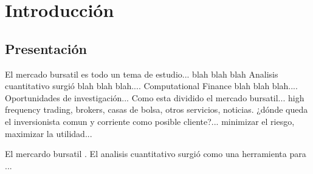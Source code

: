 

\chapter{Introducción}


\section{Presentación}

El mercado bursatil es todo un tema de estudio... blah blah blah 
Analisis cuantitativo surgió blah blah blah....
Computational Finance blah blah blah....
Oportunidades de investigación...
Como esta dividido el mercado bursatil... high frequency trading, brokers, casas de bolsa, otros servicios, noticias. 
¿dónde queda el inversionista comun y corriente como posible cliente?...
minimizar el riesgo, maximizar la utilidad...

El mercardo bursatil . El analisis cuantitativo surgió como una herramienta para ...


